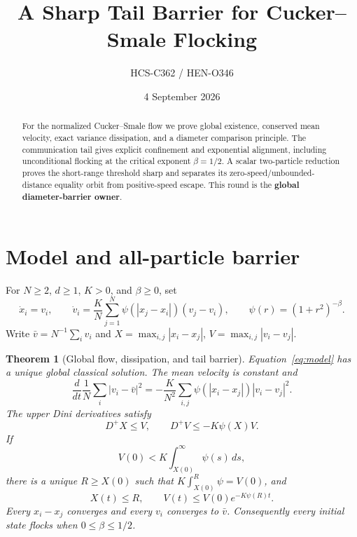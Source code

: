 \documentclass[10pt]{article}
\title{A Sharp Tail Barrier for Cucker--Smale Flocking}
\author{HCS-C362 / HEN-O346}
\date{4 September 2026}
\newtheorem{theorem}{Theorem}
\newcommand{\Dini}{D^{+}}
\begin{document}
\maketitle
\begin{abstract}
For the normalized Cucker--Smale flow we prove global existence, conserved
mean velocity, exact variance dissipation, and a diameter comparison principle.
The communication tail gives explicit confinement and exponential alignment,
including unconditional flocking at the critical exponent $\beta=1/2$.  A
scalar two-particle reduction proves the short-range threshold sharp and
separates its zero-speed/unbounded-distance equality orbit from positive-speed
escape.  This round is the \textbf{global diameter-barrier owner}.
\end{abstract}

\section{Model and all-particle barrier}
For $N\ge2$, $d\ge1$, $K>0$, and $\beta\ge0$, set
\begin{equation}\label{eq:model}
 \dot x_i=v_i,\qquad
 \dot v_i=\frac K N\sum_{j=1}^N\psi(|x_j-x_i|)(v_j-v_i),
 \qquad \psi(r)=(1+r^2)^{-\beta}.
\end{equation}
Write $\bar v=N^{-1}\sum_i v_i$ and
$X=\max_{i,j}|x_i-x_j|$, $V=\max_{i,j}|v_i-v_j|$.

\begin{theorem}[Global flow, dissipation, and tail barrier]\label{thm:main}
Equation~\eqref{eq:model} has a unique global classical solution.  The mean
velocity is constant and
\begin{equation}\label{eq:energy}
 \frac d{dt}\frac1N\sum_i|v_i-\bar v|^2
 =-\frac K{N^2}\sum_{i,j}\psi(|x_i-x_j|)|v_i-v_j|^2.
\end{equation}
The upper Dini derivatives satisfy
\begin{equation}\label{eq:diam}
 \Dini X\le V,\qquad \Dini V\le-K\psi(X)V.
\end{equation}
If
\begin{equation}\label{eq:condition}
 V(0)<K\int_{X(0)}^\infty\psi(s)\,ds,
\end{equation}
there is a unique $R\ge X(0)$ such that
$K\int_{X(0)}^R\psi=V(0)$, and
\begin{equation}\label{eq:bounds}
 X(t)\le R,\qquad V(t)\le V(0)e^{-K\psi(R)t}.
\end{equation}
Every $x_i-x_j$ converges and every $v_i$ converges to $\bar v$.
Consequently every initial state flocks when $0\le\beta\le1/2$.
\end{theorem}
\end{document}
